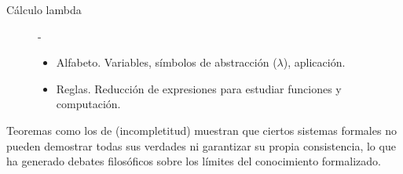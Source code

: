 \begin{description}
  \item[Cálculo lambda] -

    \begin{itemize}
      \item Alfabeto. Variables, símbolos de abstracción ($\lambda$),
        aplicación.
      \item Reglas. Reducción de expresiones para estudiar funciones y
        computación.
    \end{itemize}
\end{description}

Teoremas como los de  (incompletitud) muestran que ciertos
sistemas formales no pueden demostrar todas sus verdades ni garantizar su
propia consistencia, lo que ha generado debates filosóficos sobre los
límites del conocimiento formalizado.







